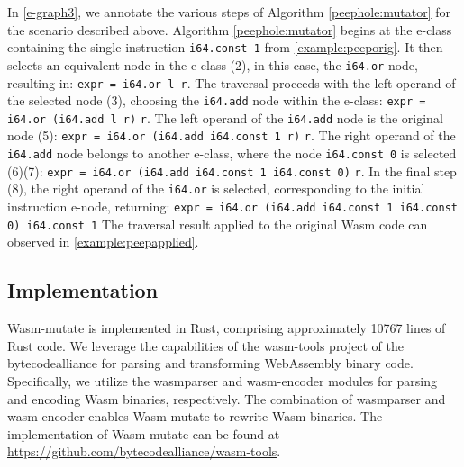 \documentclass[sigplan,screen]{acmart}
\newcommand*\badge[1]{ \colorbox{red}{\color{white}#1}}
\newcommand{\tool}{Wasm-mutate\xspace}
\newcommand{\repourl}{\url{https://github.com/bytecodealliance/wasm-tools}}
\newcommand{\todo}[1]{%
\refstepcounter{todo}
\noindent\textbf{\badge{TODO}} {\color{red}#1}
\addcontentsline{td}{todo}
{\color{red}\thesection.\thetodo\xspace #1}}
\begin{document}
In \autoref{e-graph3}, we annotate the various steps of Algorithm \ref{peephole:mutator} 
for the scenario  described above. Algorithm \ref{peephole:mutator} begins at the e-class containing the single instruction \texttt{i64.const 1} from \autoref{example:peeporig}. 
It then selects an equivalent node in the e-class (2), in this case, the \texttt{i64.or} node, resulting in:
{\texttt{expr = i64.or l r}}.
The traversal proceeds with the left operand of the selected node (3), choosing the \texttt{i64.add} node within the e-class: 
{\texttt{expr = i64.or (i64.add l r)} \texttt{r}}.
The left operand of the \texttt{i64.add} node is the original node (5): 
{\texttt{expr = i64.or (i64.add i64.const 1 r)} \texttt{r}}.
The right operand of the \texttt{i64.add} node belongs to another e-class, where the node \texttt{i64.const 0} is selected (6)(7):
{\texttt{expr = i64.or (i64.add i64.const 1 i64.const 0)} \texttt{r}}.
In the final step (8), the right operand of the \texttt{i64.or} is selected, corresponding to the initial instruction e-node, returning:
{\texttt{expr = i64.or (i64.add i64.const 1 i64.const 0)\ i64.const 1}}
The traversal result applied to the original Wasm code can observed in \autoref{example:peepapplied}. 

\subsection{Implementation}

\tool is implemented in Rust, comprising approximately 10767 lines of Rust code. 
We leverage the capabilities of the wasm-tools project of the bytecodealliance for parsing and transforming WebAssembly binary code. 
Specifically, we utilize the wasmparser and wasm-encoder modules for parsing and encoding Wasm binaries, respectively.
The combination of wasmparser and wasm-encoder enables \tool to rewrite Wasm binaries. 
The implementation of \tool can be found at \repourl.




\end{document}
